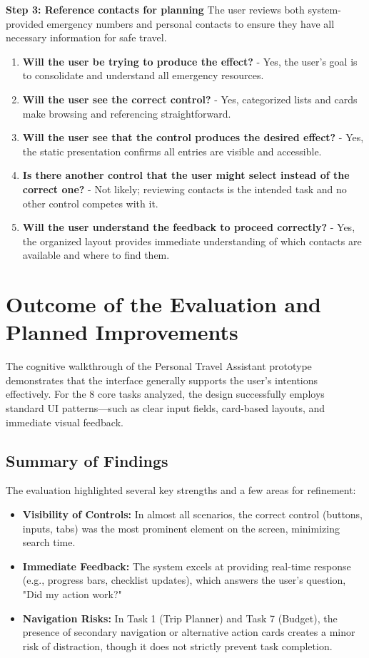 \documentclass[11pt,a4paper]{article}
\begin{document}
\textbf{Step 3: Reference contacts for planning}  
The user reviews both system-provided emergency numbers and personal contacts to ensure they have all necessary information for safe travel.  

\begin{enumerate}
    \item \textbf{Will the user be trying to produce the effect?} - Yes, the user’s goal is to consolidate and understand all emergency resources.
    \item \textbf{Will the user see the correct control?} - Yes, categorized lists and cards make browsing and referencing straightforward.
    \item \textbf{Will the user see that the control produces the desired effect?} - Yes, the static presentation confirms all entries are visible and accessible.
    \item \textbf{Is there another control that the user might select instead of the correct one?} - Not likely; reviewing contacts is the intended task and no other control competes with it.
    \item \textbf{Will the user understand the feedback to proceed correctly?} - Yes, the organized layout provides immediate understanding of which contacts are available and where to find them.
\end{enumerate}

\newpage
\section*{Outcome of the Evaluation and Planned Improvements}

The cognitive walkthrough of the Personal Travel Assistant prototype demonstrates that the interface generally supports the user's intentions effectively. For the 8 core tasks analyzed, the design successfully employs standard UI patterns—such as clear input fields, card-based layouts, and immediate visual feedback.

\subsection*{Summary of Findings}
The evaluation highlighted several key strengths and a few areas for refinement:
\begin{itemize}
    \item \textbf{Visibility of Controls:} In almost all scenarios, the correct control (buttons, inputs, tabs) was the most prominent element on the screen, minimizing search time.
    \item \textbf{Immediate Feedback:} The system excels at providing real-time response (e.g., progress bars, checklist updates), which answers the user's question, "Did my action work?"
    \item \textbf{Navigation Risks:} In Task 1 (Trip Planner) and Task 7 (Budget), the presence of secondary navigation or alternative action cards creates a minor risk of distraction, though it does not strictly prevent task completion.
\end{itemize}
\end{document}
